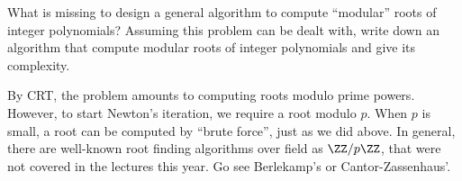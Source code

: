 \documentclass[11pt]{exam}
\theoremstyle{definition}
\begin{document}
{\begin{questions}



    \question What is missing to design a general algorithm to compute ``modular'' roots of integer polynomials? Assuming this problem can be dealt with, write down an algorithm that compute modular roots of integer polynomials and give its complexity.
    
    \begin{solution}
      By CRT, the problem amounts to computing roots modulo prime powers. However, to start Newton's iteration, we require a root modulo $p$. When $p$ is small, a root can be computed by ``brute force'', just as we did above. In general, there are well-known root finding algorithms over field as $\ZZ/p\ZZ$, that were not covered in the lectures this year. Go see Berlekamp's or Cantor-Zassenhaus'.


\end{solution}
\end{questions}}
\end{document}
